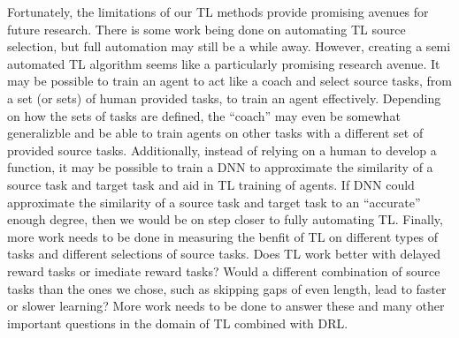 \documentclass{llncs}
\begin{document}
Fortunately, the limitations of our TL methods provide promising avenues for future research. 
There is some work being done on automating TL source selection, but full automation may still be a while away. 
However, creating a semi automated TL algorithm seems like a particularly promising research avenue. 
It may be possible to train an agent to act like a coach and select source tasks, from a set (or sets) of human provided tasks, to train an agent effectively. 
Depending on how the sets of tasks are defined, the ``coach'' may even be somewhat generalizble and be able to train agents on other tasks with a different set of provided source tasks. 
Additionally, instead of relying on a human to develop a function, it may be possible to train a DNN to approximate the similarity of a source task and target task and aid in TL training of agents. 
If DNN could approximate the similarity of a source task and target task to an ``accurate'' enough degree, then we would be on step closer to fully automating TL.
Finally, more work needs to be done in measuring the benfit of TL on different types of tasks and different selections of source tasks.
Does TL work better with delayed reward tasks or imediate reward tasks?
Would a different combination of source tasks than the ones we chose, such as skipping gaps of even length, lead to faster or slower learning?
More work needs to be done to answer these and many other important questions in the domain of TL combined with DRL. 


%
%
\newpage{}



\end{document}
